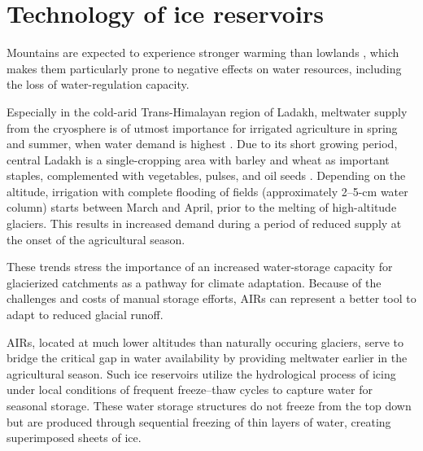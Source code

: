 \chapter{Technology of ice reservoirs}
\label{chap:tech}


Mountains are expected to experience stronger warming than lowlands
\citep{ragettliContrastingClimateChange2016}, which makes them particularly prone to negative effects on
water resources, including the loss of water-regulation capacity.

Especially in the cold-arid Trans-Himalayan region of Ladakh, meltwater supply from the cryosphere is of utmost
importance for irrigated agriculture in spring and summer, when water demand is highest
\citep{nusserCryosphereFedIrrigationNetworks2019}. Due to its short growing period, central Ladakh is a
single-cropping area with barley and wheat as important staples, complemented with vegetables, pulses, and oil
seeds \citep{nusserSociohydrologyArtificialGlaciers2019}. Depending on the altitude, irrigation with complete
flooding of fields (approximately 2–5-cm water column) starts between March and April, prior to the melting of
high-altitude glaciers. This results in increased demand during a period of reduced supply at the onset of the
agricultural season.

These trends stress the importance of an increased water-storage capacity for glacierized catchments as a pathway
for climate adaptation. Because of the challenges and costs of manual storage efforts, AIRs can represent
a better tool to adapt to reduced glacial runoff.

AIRs, located at much lower altitudes than naturally occuring glaciers, serve to bridge the critical gap in
water availability by providing meltwater earlier in the agricultural season. Such ice reservoirs utilize the
hydrological process of icing under local conditions of frequent freeze--thaw cycles to capture water for
seasonal storage. These water storage structures do not freeze from the top down but are produced
through sequential freezing of thin layers of water, creating superimposed sheets of ice.



